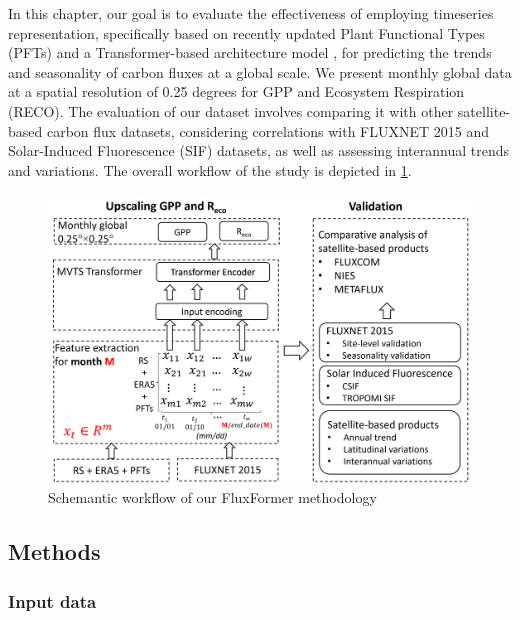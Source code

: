 In this chapter, our goal is to evaluate the effectiveness of employing timeseries representation, specifically based on recently updated Plant Functional Types (PFTs) \citep{harper202229} and a Transformer-based architecture model \citep{zerveas2021transformer}, for predicting the trends and seasonality of carbon fluxes at a global scale. We present monthly global data at a spatial resolution of 0.25 degrees for GPP and Ecosystem Respiration (RECO). The evaluation of our dataset involves comparing it with other satellite-based carbon flux datasets, considering correlations with FLUXNET 2015 and Solar-Induced Fluorescence (SIF) datasets, as well as assessing interannual trends and variations. The overall workflow of the study is depicted in \ref{fig:chap6_fig1}.

\begin{figure}[tbh!]
    \centering
    \includegraphics[width=\textwidth]{figs/chap6/workflow.png}
    \caption[Schemantic workflow of our FluxFormer methodology]{Schemantic workflow of our FluxFormer methodology}
    \label{fig:chap6_fig1}
\end{figure}

\subsection{Methods}
\subsubsection*{Input data}

